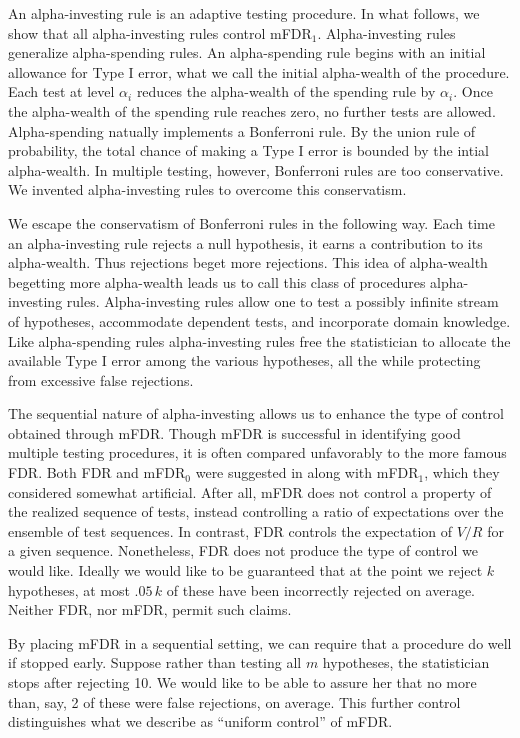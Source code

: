 \documentclass[12pt]{article}
\begin{document}
An alpha-investing rule is an adaptive testing procedure. In what
follows, we show that all alpha-investing rules control mFDR${}_1$.
Alpha-investing rules generalize alpha-spending rules.  An
alpha-spending rule begins with an initial allowance for Type I error,
what we call the initial alpha-wealth of the procedure.  Each test at
level $\alpha_i$ reduces the alpha-wealth of the spending rule by
$\alpha_i$.  Once the alpha-wealth of the spending rule reaches zero,
no further tests are allowed.  Alpha-spending natually implements a
Bonferroni rule.  By the union rule of probability, the total chance
of making a Type I error is bounded by the intial alpha-wealth.  In
multiple testing, however, Bonferroni rules are too conservative.  We
invented alpha-investing rules to overcome this conservatism.

We escape the conservatism of Bonferroni rules in the following
 way. Each time an alpha-investing rule rejects a null hypothesis, it
 earns a contribution to its alpha-wealth.  Thus rejections beget more
 rejections.  This idea of alpha-wealth begetting more alpha-wealth
 leads us to call this class of procedures alpha-investing
 rules. Alpha-investing rules allow one to test a possibly infinite
 stream of hypotheses, accommodate dependent tests, and incorporate
 domain knowledge.  Like alpha-spending rules alpha-investing rules
 free the statistician to allocate the available Type I error among the
 various hypotheses, all the while protecting from
 excessive false rejections.

The sequential nature of alpha-investing allows us to enhance the
 type of control obtained through mFDR. Though mFDR is successful
 in identifying good multiple testing procedures, it is often compared
 unfavorably to the more famous FDR.  Both FDR and mFDR${}_0$ were suggested
 in \citet{benjamini95} along with mFDR${}_1$, which they considered
 somewhat artificial. After all, mFDR does not control a property of
 the realized sequence of tests, instead controlling a ratio of
 expectations over the ensemble of test sequences. In contrast, FDR
 controls the expectation of $V/R$ for a given sequence.  Nonetheless,
 FDR does not produce the type of control we would like.  Ideally we
 would like to be guaranteed that at the point we reject $k$
 hypotheses, at most $.05\,k$ of these have been incorrectly rejected
 on average.  Neither FDR, nor mFDR, permit such claims.

By placing mFDR in a sequential setting, we can require that a
 procedure do well if stopped early.  Suppose rather than testing all
 $m$ hypotheses, the statistician stops after rejecting 10.
  We would like to be able to assure her that no more than, say, 2 of
 these were false rejections, on average.  This further control distinguishes
 what we describe as ``uniform control'' of mFDR.
\end{document}
